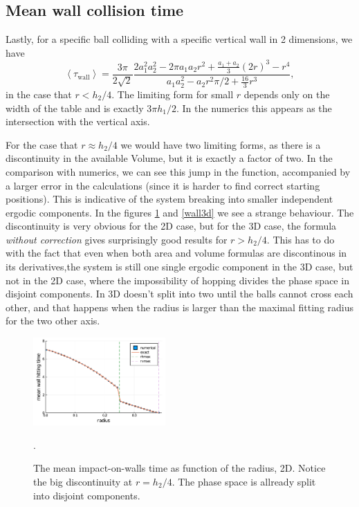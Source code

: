 \documentclass[superscriptaddress,pre,reprint,showpacs,twocolumn]{revtex4-1}
\newcommand{\mean}[1]{\left \langle #1 \right \rangle}
\begin{document}
\subsection{Mean wall collision time}

Lastly, for a specific ball colliding with a specific vertical wall
in 2 dimensions, we have
\begin{equation}\label{impactwall}
 \mean{\tau_\text{wall}} = 	
\frac{3 \pi}{2\sqrt{2}}
\frac { 2a_1^2 a_2^2  -  2\pi a_1 a_2 r^2 + \frac{a_1+a_2}{3}(2r)^3 - r^4}
{a_1a_2^2-a_2 r^2\pi/2 + \frac{16}{3} r^3 },
\end{equation}
in the case that $r<h_2/4$. The limiting form for small $r$ depends
only on the width of the table and is exactly
$3\pi h_1/2$. In the numerics this appears as the intersection with the vertical
axis.

For the case that $r\approx h_2/4$ we would have two limiting forms,
as there is a discontinuity in the available Volume, but it is exactly
a factor of two. In the comparison with numerics, we can see
this jump in the function, accompanied by a larger error in the
calculations (since it is harder to find correct starting positions). 
This is indicative of 
the system breaking into smaller independent ergodic components.
In the figures \ref{wall2d} and \ref{wall3d} we see a strange
behaviour. The discontinuity is very obvious for the 2D case,
but for the 3D case, the formula \emph{without correction}
gives surprisingly good results for $r > h_2/4$. This has to
do with the fact that even when both area and volume
formulas are discontinous in its derivatives,the system is still
one single ergodic component in the 3D case, but not in the
2D case, where the impossibility of hopping divides the phase space
in disjoint components. In 3D doesn't split into two until
the balls cannot cross each other, and that happens when
the radius is larger than the maximal fitting radius for
the two other axis.  

\begin{figure}[h]
  \centering
  \includegraphics[width=0.45\textwidth]{./figures/wall2d.pdf}
  \caption{The mean impact-on-walls time as function of the radius, 2D.
    Notice the big discontinuity at $r=h_2/4$. The phase space is
  allready split into disjoint components.}
    \label{wall2d}.
\end{figure}
\end{document}
